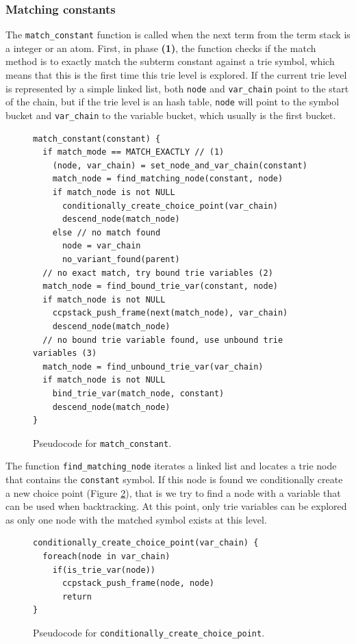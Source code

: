 \subsubsection{Matching constants}

The \texttt{match\_constant} function is called when the next term from the term stack is a integer or an
atom. First, in phase \textbf{(1)}, the function checks if the match method is to exactly match the
subterm constant against a trie symbol, which means
that this is the first time this trie level is explored. If the current trie level is represented by a simple
linked list, both \texttt{node} and \texttt{var\_chain} point to the start of the chain, but if the trie level
is an hash table, \texttt{node} will point to the symbol bucket and \texttt{var\_chain} to the variable
bucket, which usually is the first bucket.

\begin{figure}[ht]
\begin{Verbatim}[fontsize=\small]
match_constant(constant) {
  if match_mode == MATCH_EXACTLY // (1)
    (node, var_chain) = set_node_and_var_chain(constant)
    match_node = find_matching_node(constant, node)
    if match_node is not NULL
      conditionally_create_choice_point(var_chain)
      descend_node(match_node)
    else // no match found
      node = var_chain
      no_variant_found(parent)
  // no exact match, try bound trie variables (2)
  match_node = find_bound_trie_var(constant, node)
  if match_node is not NULL
    ccpstack_push_frame(next(match_node), var_chain)
    descend_node(match_node)
  // no bound trie variable found, use unbound trie variables (3)
  match_node = find_unbound_trie_var(var_chain)
  if match_node is not NULL
    bind_trie_var(match_node, constant)
    descend_node(match_node)
}
\end{Verbatim}
\caption{Pseudo\-code for \texttt{match\_constant}.}
\label{fig:match_constant}
\end{figure}

The function \texttt{find\_matching\_node} iterates a linked list and locates a trie node that contains the
\texttt{constant} symbol. If this node is found we conditionally create a
new choice point (Figure \ref{fig:conditionally_create_choice_point}), that is
we try to find a node with a variable that can be used when backtracking. At this point, only
trie variables can be explored as only one node with the matched symbol exists at this level.

\begin{figure}[ht]
\begin{Verbatim}[fontsize=\small]
conditionally_create_choice_point(var_chain) {
  foreach(node in var_chain)
    if(is_trie_var(node))
      ccpstack_push_frame(node, node)
      return
}
\end{Verbatim}
\caption{Pseudo\-code for \texttt{conditionally\_create\_choice\_point}.}
\label{fig:conditionally_create_choice_point}
\end{figure}

